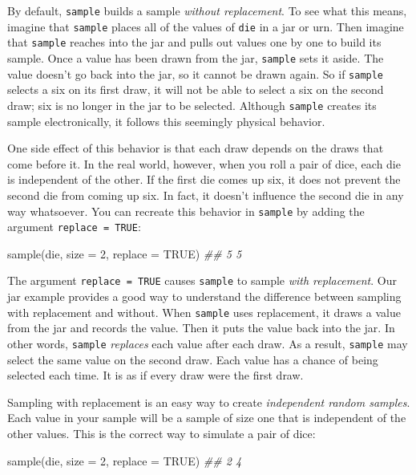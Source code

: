 \documentclass[
  letterpaper,
  DIV=11,
  numbers=noendperiod]{scrbook}
\newenvironment{Shaded}{\begin{snugshade}}{\end{snugshade}}
\newcommand{\AttributeTok}[1]{\textcolor[rgb]{0.40,0.45,0.13}{#1}}
\newcommand{\ConstantTok}[1]{\textcolor[rgb]{0.56,0.35,0.01}{#1}}
\newcommand{\DecValTok}[1]{\textcolor[rgb]{0.68,0.00,0.00}{#1}}
\newcommand{\DocumentationTok}[1]{\textcolor[rgb]{0.37,0.37,0.37}{\textit{#1}}}
\newcommand{\FunctionTok}[1]{\textcolor[rgb]{0.28,0.35,0.67}{#1}}
\newcommand{\NormalTok}[1]{\textcolor[rgb]{0.00,0.23,0.31}{#1}}
\begin{document}
By default, \texttt{sample} builds a sample \emph{without replacement}.
To see what this means, imagine that \texttt{sample} places all of the
values of \texttt{die} in a jar or urn. Then imagine that
\texttt{sample} reaches into the jar and pulls out values one by one to
build its sample. Once a value has been drawn from the jar,
\texttt{sample} sets it aside. The value doesn't go back into the jar,
so it cannot be drawn again. So if \texttt{sample} selects a six on its
first draw, it will not be able to select a six on the second draw; six
is no longer in the jar to be selected. Although \texttt{sample} creates
its sample electronically, it follows this seemingly physical behavior.

One side effect of this behavior is that each draw depends on the draws
that come before it. In the real world, however, when you roll a pair of
dice, each die is independent of the other. If the first die comes up
six, it does not prevent the second die from coming up six. In fact, it
doesn't influence the second die in any way whatsoever. You can recreate
this behavior in \texttt{sample} by adding the argument
\texttt{replace\ =\ TRUE}:

\begin{Shaded}
\begin{Highlighting}[]
\FunctionTok{sample}\NormalTok{(die, }\AttributeTok{size =} \DecValTok{2}\NormalTok{, }\AttributeTok{replace =} \ConstantTok{TRUE}\NormalTok{)}
\DocumentationTok{\#\# 5 5}
\end{Highlighting}
\end{Shaded}

The argument \texttt{replace\ =\ TRUE} causes \texttt{sample} to sample
\emph{with replacement}. Our jar example provides a good way to
understand the difference between sampling with replacement and without.
When \texttt{sample} uses replacement, it draws a value from the jar and
records the value. Then it puts the value back into the jar. In other
words, \texttt{sample} \emph{replaces} each value after each draw. As a
result, \texttt{sample} may select the same value on the second draw.
Each value has a chance of being selected each time. It is as if every
draw were the first draw.

Sampling with replacement is an easy way to create \emph{independent
random samples}. Each value in your sample will be a sample of size one
that is independent of the other values. This is the correct way to
simulate a pair of dice:

\begin{Shaded}
\begin{Highlighting}[]
\FunctionTok{sample}\NormalTok{(die, }\AttributeTok{size =} \DecValTok{2}\NormalTok{, }\AttributeTok{replace =} \ConstantTok{TRUE}\NormalTok{)}
\DocumentationTok{\#\# 2 4}
\end{Highlighting}
\end{Shaded}
\end{document}
